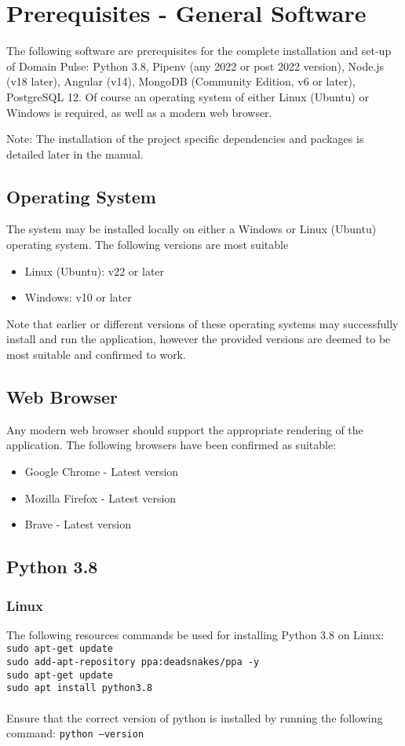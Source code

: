 \documentclass{article}
\newcommand{\code}[1]{\colorbox{light-gray}{\texttt{#1}}}
\begin{document}
\section{Prerequisites - General Software}
The following software are prerequisites for the complete installation and set-up of Domain Pulse: Python 3.8, Pipenv (any 2022 or post 2022 version), Node.js (v18 later), Angular (v14), MongoDB (Community Edition, v6 or later), PostgreSQL 12.
Of course an operating system of either Linux (Ubuntu) or Windows is required, as well as a modern web browser.

Note: The installation of the project specific dependencies and packages is detailed later in the manual.

\subsection{Operating System}
The system may be installed locally on either a Windows or Linux (Ubuntu) operating system. The following versions are most suitable
\begin{itemize}
    \item Linux (Ubuntu): v22 or later
    \item Windows: v10 or later
\end{itemize}
Note that earlier or different versions of these operating systems may successfully install and run the application, however the provided
versions are deemed to be most suitable and confirmed to work.

\subsection{Web Browser}
Any modern web browser should support the appropriate rendering of the application. The following browsers have been confirmed as suitable:
\begin{itemize}
    \item Google Chrome - Latest version
    \item Mozilla Firefox - Latest version
    \item Brave - Latest version
\end{itemize}

\subsection{Python 3.8}
\subsubsection{Linux}
The following resources commands be used for installing Python 3.8 on Linux:\\
\code{sudo apt-get update}\\
\code{sudo add-apt-repository ppa:deadsnakes/ppa -y}\\
\code{sudo apt-get update}\\
\code{sudo apt install python3.8}\\ \\
Ensure that the correct version of python is installed by running the following command:
\code{python --version}
\end{document}
